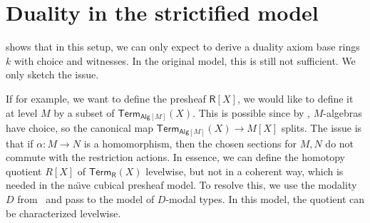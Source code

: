 \documentclass[10pt,a4paper]{article}
\theoremstyle{definition}
\theoremstyle{remark}
\newcommand{\Alg}{\mathsf{Alg}}
\newcommand\R{\mathsf{R}}
\newcommand\Term{\mathsf{Term}}
\begin{document}
\section{Duality in the strictified model}\label{sec:duality-in-model-of-modal-types}

 shows that in this setup, we can only expect to derive a duality axiom base rings \(k\) with choice and witnesses.
In the original model, this is still not sufficient.
We only sketch the issue.

If for example, we want to define the presheaf \(\R[X]\), we would like to define it at level \(M\) by a subset of \(\Term_{\Alg[M]}(X)\).
This is possible since by , \(M\)-algebras have choice, so the canonical map \(\Term_{\Alg[M]}(X) \to M[X]\) splits.
The issue is that if \(\alpha \colon M \to N\) is a homomorphism, then the chosen sections for \(M, N\) do not commute with the restriction actions.
In essence, we can define the homotopy quotient \(R[X]\) of \(\Term_{\R}(X)\) levelwise, but not in a coherent way, which is needed in the na{\"\i}ve cubical presheaf model.
To resolve this, we use the modality \(D\) from~\cite{CRS21} and pass to the model of \(D\)-modal types.
In this model, the quotient can be characterized levelwise.
\end{document}
